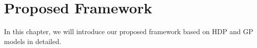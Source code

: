 \chapter{Proposed Framework}
\label{chap:framework}
In this chapter, we will introduce our proposed framework based on HDP and GP models in detailed. 
